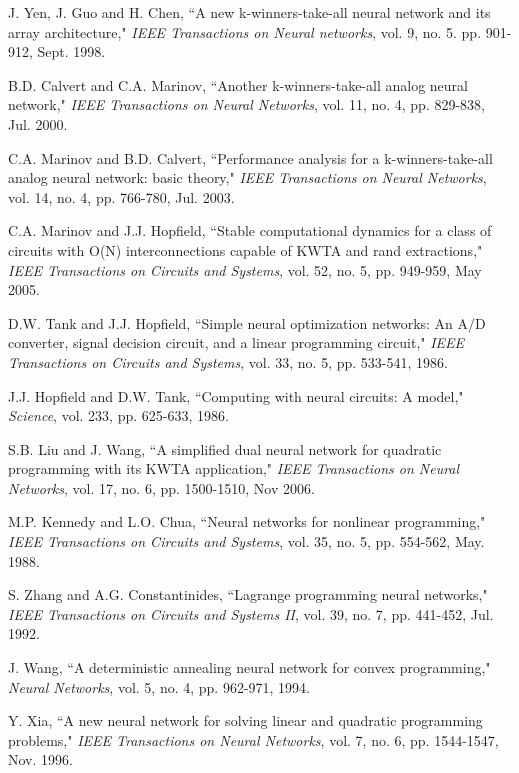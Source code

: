 \documentclass[conference]{IEEEtran}
\begin{document}
\begin{thebibliography}{22}
 J. Yen, J. Guo and H. Chen, ``A new k-winners-take-all neural network and its array architecture,"
        {\it IEEE Transactions on Neural networks}, vol. 9, no. 5. pp. 901-912, Sept. 1998.

 B.D. Calvert and C.A. Marinov, ``Another k-winners-take-all analog neural network,"
        {\it IEEE Transactions on Neural Networks}, vol. 11, no. 4, pp. 829-838, Jul. 2000.

 C.A. Marinov and B.D. Calvert, ``Performance analysis for a k-winners-take-all analog neural network: basic theory,"
        {\it IEEE Transactions on Neural Networks}, vol. 14, no. 4, pp. 766-780, Jul. 2003.

 C.A. Marinov and J.J. Hopfield, ``Stable computational dynamics for a class of circuits with O(N) interconnections capable of KWTA and rand extractions,"
        {\it IEEE Transactions on Circuits and Systems}, vol. 52, no. 5, pp. 949-959, May 2005.

 D.W. Tank and J.J. Hopfield, ``Simple neural optimization networks: An A/D converter, signal decision circuit, and a linear programming circuit,"
        {\it IEEE Transactions on Circuits and Systems}, vol. 33, no. 5, pp. 533-541, 1986.

 J.J. Hopfield and D.W. Tank, ``Computing with neural circuits: A model,"
        {\it Science}, vol. 233, pp. 625-633, 1986.



 S.B. Liu and J. Wang, ``A simplified dual neural network for quadratic programming with its KWTA application,"
        {\it IEEE Transactions on Neural Networks}, vol. 17, no. 6, pp. 1500-1510, Nov 2006.



 M.P. Kennedy and L.O. Chua, ``Neural networks for nonlinear programming,"
        {\it IEEE Transactions on Circuits and Systems}, vol. 35, no. 5, pp. 554-562, May. 1988.

 S. Zhang and A.G. Constantinides, ``Lagrange programming neural networks,"
        {\it IEEE Transactions on Circuits and Systems II}, vol. 39, no. 7, pp. 441-452, Jul. 1992.

 J. Wang, ``A deterministic annealing neural network for convex programming,"
        {\it Neural Networks}, vol. 5, no. 4, pp. 962-971, 1994.

 Y. Xia, ``A new neural network for solving linear and quadratic programming problems,"
        {\it IEEE Transactions on Neural Networks}, vol. 7, no. 6, pp. 1544-1547, Nov. 1996.


\end{thebibliography}
\end{document}
